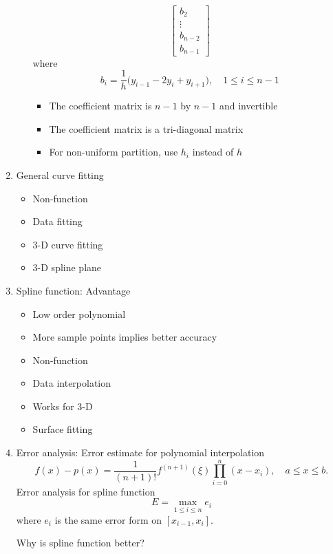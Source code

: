 \documentclass{article}
\theoremstyle{remark}
\begin{document}
\begin{enumerate}
\begin{enumerate}
$$\begin{bmatrix}
b_2\\
\vdots\\
b_{n-2}\\
b_{n-1}
\end{bmatrix}
$$
where 
$$
b_i = \frac{1}{h}\Big(y_{i-1}-2y_i+y_{i+1}\Big),\quad 1\leq i\leq n-1
$$
\begin{itemize}
\item The coefficient matrix is $n-1$ by $n-1$ and invertible
\item The coefficient matrix is a tri-diagonal matrix
\item For non-uniform partition, use $h_i$ instead of $h$
\end{itemize}
\end{enumerate}

\item General curve fitting
\begin{itemize}
\item Non-function
\item Data fitting
\item 3-D curve fitting
\item 3-D spline plane
\end{itemize}

\item Spline function: Advantage 
\begin{itemize}
\item Low order polynomial
\item More sample points implies better accuracy
\item Non-function
\item Data interpolation
\item Works for 3-D
\item Surface fitting
\end{itemize}

\item Error analysis: Error estimate for polynomial interpolation
$$
f(x)-p(x) = \frac{1}{(n+1)!}f^{(n+1)}(\xi)\prod_{i=0}^n(x-x_i),\quad a\leq x\leq b.
$$
Error analysis for spline function 
$$
E = \max_{1\leq i\leq n} e_i 
$$
where $e_i$  is the same error form on $[x_{i-1},x_i]$.
\begin{center}
{\color{red} Why is spline function better?}
\end{center}
\end{enumerate}


\end{document}
